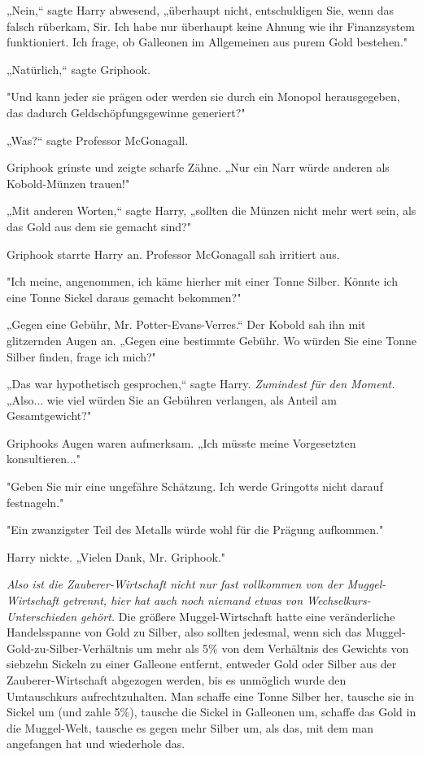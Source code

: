 {„Nein,“ sagte Harry abwesend, „überhaupt nicht, entschuldigen Sie, wenn das falsch rüberkam, Sir. Ich habe nur überhaupt keine Ahnung wie ihr Finanzsystem funktioniert. Ich frage, ob Galleonen im Allgemeinen aus purem Gold bestehen."

„Natürlich,“ sagte Griphook.

"Und kann jeder sie prägen oder werden sie durch ein Monopol herausgegeben, das dadurch Geldschöpfungsgewinne generiert?"

„Was?“ sagte Professor McGonagall.

Griphook grinste und zeigte scharfe Zähne. „Nur ein Narr würde anderen als Kobold-Münzen trauen!"

„Mit anderen Worten,“ sagte Harry, „sollten die Münzen nicht mehr wert sein, als das Gold aus dem sie gemacht sind?"

Griphook starrte Harry an. Professor McGonagall sah irritiert aus.

"Ich meine, angenommen, ich käme hierher mit einer Tonne Silber. Könnte ich eine Tonne Sickel daraus gemacht bekommen?"

„Gegen eine Gebühr, Mr. Potter-Evans-Verres.“ Der Kobold sah ihn mit glitzernden Augen an. „Gegen eine bestimmte Gebühr. Wo würden Sie eine Tonne Silber finden, frage ich mich?"

„Das war hypothetisch gesprochen,“ sagte Harry. \emph{Zumindest für den Moment.} „Also... wie viel würden Sie an Gebühren verlangen, als Anteil am Gesamtgewicht?"

Griphooks Augen waren aufmerksam. „Ich müsste meine Vorgesetzten konsultieren..."

"Geben Sie mir eine ungefähre Schätzung. Ich werde Gringotts nicht darauf festnageln."

"Ein zwanzigster Teil des Metalls würde wohl für die Prägung aufkommen."

Harry nickte. „Vielen Dank, Mr. Griphook."

\emph{Also ist die Zauberer-Wirtschaft nicht nur fast vollkommen von der Muggel-Wirtschaft getrennt, hier hat auch noch niemand etwas von Wechselkurs-Unterschieden gehört.} Die größere Muggel-Wirtschaft hatte eine veränderliche Handelsspanne von Gold zu Silber, also sollten jedesmal, wenn sich das Muggel-Gold-zu-Silber-Verhältnis um mehr als 5\% von dem Verhältnis des Gewichts von siebzehn Sickeln zu einer Galleone entfernt, entweder Gold oder Silber aus der Zauberer-Wirtschaft abgezogen werden, bis es unmöglich wurde den Umtauschkurs aufrechtzuhalten. Man schaffe eine Tonne Silber her, tausche sie in Sickel um (und zahle 5\%), tausche die Sickel in Galleonen um, schaffe das Gold in die Muggel-Welt, tausche es gegen mehr Silber um, als das, mit dem man angefangen hat und wiederhole das.

}
